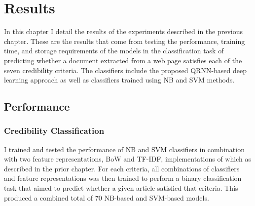 \documentclass[a4paper,twoside,phd]{BYUPhys}
\begin{document}
\chapter{Results}
\label{chap:Results}

In this chapter I detail the results of the experiments described in the previous chapter. These are the results that come from testing the performance, training time, and storage requirements of the models in the classification task of predicting whether a document extracted from a web page satisfies each of the seven credibility criteria. The classifiers include the proposed QRNN-based deep learning approach as well as classifiers trained using NB and SVM methods.

\section{Performance}
\label{sec:AccuracyResults}
\subsection{Credibility Classification}
\label{sec:CredibilityClassificationResults}

I trained and tested the performance of NB and SVM classifiers in combination with two feature representations, BoW and TF-IDF, implementations of which as described in the prior chapter. For each criteria, all combinations of classifiers and feature representations was then trained to perform a binary classification task that aimed to predict whether a given article satisfied that criteria. This produced a combined total of 70 NB-based and SVM-based models. \newline
\end{document}
